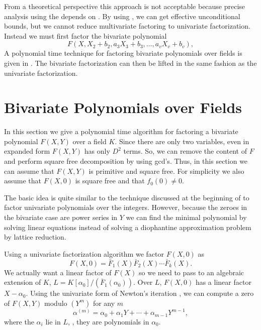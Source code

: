 From a theoretical perspective this approach is not acceptable because
precise analysis using the 
depends on .  By using , we
can get effective unconditional bounds, but we cannot reduce
multivariate factoring to univariate factorization.  Instead we must
first factor the bivariate polynomial
\[
F(X, X_2 + b_2, a_3 X_3 + b_3, \ldots, a_v X_v + b_v),
\]
A polynomial time technique for factoring bivariate polynomials over
fields is given in .  The bivariate
factorization can then be lifted in the same fashion as the univariate
factorization.

\section{Bivariate Polynomials over Fields}
\label{GF:BiFactor:Sec}

In this section we give a polynomial time algorithm for factoring a
bivariate polynomial $F(X, Y)$ over a field $K$. Since there are only two
variables, even in expanded form $F(X, Y)$ has only $D^2$ terms.  So,
we can remove the content of $F$ and perform square free decomposition
by using {\sc gcd}'s.  Thus, in this section we can assume that $F(X,
Y)$ is primitive and square free.  For simplicity we also assume that
$F(X, 0)$ is square free and that $f_0(0) \not=0$.

The basic idea is quite similar to the technique discussed at the
beginning of  to factor univariate polynomials
over the integers.  However, because the zeroes in the bivariate case
are power series in $Y$ we can find the minimal polynomial by solving
linear equations instead of solving a diophantine approximation
problem by lattice reduction. 

Using a univariate factorization algorithm we factor $F(X, 0)$ as
\[
F(X, 0) = \bar{F}_1(X) \bar{F}_2(X) \cdots \bar{F}_k(X).
\]
We actually want a linear factor of $F(X)$ so we need to pass to an
algebraic extension of $K$, $L = K[\alpha_0]/(\bar{F}_1(\alpha_0))$.
Over $L$, $F(X, 0)$ has a linear factor $X - \alpha_0$.  Using the
univariate form of Newton's iteration , we
can compute a zero of $F(X, Y)$ modulo $(Y^m)$ for any $m$
\[
\alpha^{(m)} = \alpha_0 + \alpha_1 Y + \cdots + \alpha_{m-1} Y^{m-1},
\]
where the $\alpha_i$ lie in $L$, \ie, they are polynomials in
$\alpha_0$.

